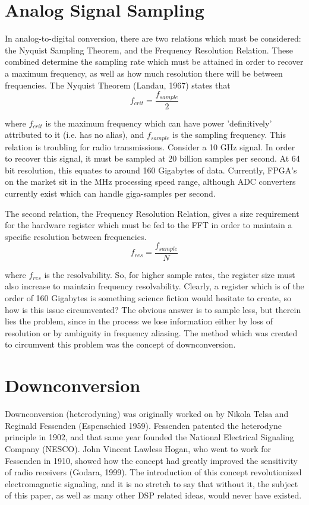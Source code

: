 \documentclass{report}
\begin{document}
\section{Analog Signal Sampling}

In analog-to-digital conversion, there are two relations which must be considered: the Nyquist Sampling Theorem, and the Frequency Resolution Relation.  These combined determine the sampling rate which must be attained in order to recover a maximum frequency, as well as how much resolution there will be between frequencies.  The Nyquist Theorem (Landau, 1967) states that
\begin{equation}
f_{crit} = \frac{f_{sample}}{2}
\end{equation}

where $f_{crit}$ is the maximum frequency which can have power 'definitively' attributed to it (i.e. has no alias), and $f_{sample}$ is the sampling frequency.  This relation is troubling for radio transmissions.  Consider a 10 GHz signal.  In order to recover this signal, it must be sampled at 20 billion samples per second.  At 64 bit resolution, this equates to around 160 Gigabytes of data.  Currently, FPGA's on the market sit in the MHz processing speed range, although ADC converters currently exist which can handle giga-samples per second.

The second relation, the Frequency Resolution Relation, gives a size requirement for the hardware register which must be fed to the FFT in order to maintain a specific resolution between frequencies.
\begin{equation}
f_{res} = \frac{f_{sample}}{N}
\end{equation}

where $f_{res}$ is the resolvability.  So, for higher sample rates, the register size must also increase to maintain frequency resolvability.  Clearly, a register which is of the order of 160 Gigabytes is something science fiction would hesitate to create, so how is this issue circumvented? The obvious answer is to sample less, but therein lies the problem, since in the process we lose information either by loss of resolution or by ambiguity in frequency aliasing.  The method which was created to circumvent this problem was the concept of downconversion.

\section{Downconversion}

Downconversion (heterodyning) was originally worked on by Nikola Telsa and Reginald Fessenden (Espenschied 1959).  Fessenden patented the heterodyne principle in 1902, and that same year founded the National Electrical Signaling Company (NESCO).  John Vincent Lawless Hogan, who went to work for Fessenden in 1910, showed how the concept had greatly improved the sensitivity of radio receivers (Godara, 1999).  The introduction of this concept revolutionized electromagnetic signaling, and it is no stretch to say that without it, the subject of this paper, as well as many other DSP related ideas, would never have existed.
\end{document}
